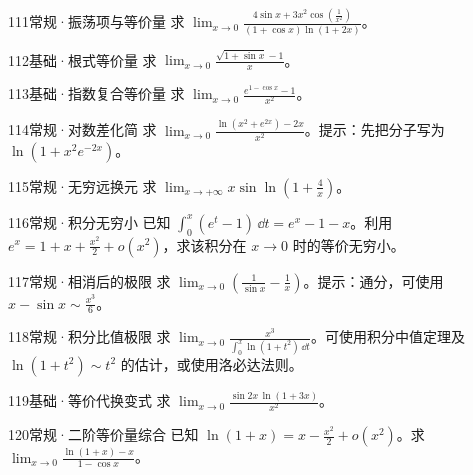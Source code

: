 \begin{exercise}{111}{常规·振荡项与等价量}
求 $\lim_{x\to0}\frac{4\sin x+3x^2\cos(\frac{1}{x^2})}{(1+\cos x)\ln(1+2x)}$。
\end{exercise}
\begin{exercise}{112}{基础·根式等价量}
求 $\lim_{x\to0}\frac{\sqrt{1+\sin x}-1}{x}$。
\end{exercise}
\begin{exercise}{113}{基础·指数复合等价量}
求 $\lim_{x\to0}\frac{e^{1-\cos x}-1}{x^2}$。
\end{exercise}
\begin{exercise}{114}{常规·对数差化简}
求 $\lim_{x\to0}\frac{\ln(x^2+e^{2x})-2x}{x^2}$。提示：先把分子写为 $\ln(1+x^2e^{-2x})$。
\end{exercise}
\begin{exercise}{115}{常规·无穷远换元}
求 $\lim_{x\to+\infty}x\sin\ln(1+\frac{4}{x})$。
\end{exercise}
\begin{exercise}{116}{常规·积分无穷小}
已知 $\int_0^x(e^t-1)\,\dd t=e^x-1-x$。利用 $e^x=1+x+\frac{x^2}{2}+o(x^2)$，求该积分在 $x\to0$ 时的等价无穷小。
\end{exercise}
\begin{exercise}{117}{常规·相消后的极限}
求 $\lim_{x\to0}(\frac{1}{\sin x}-\frac{1}{x})$。提示：通分，可使用 $x-\sin x\sim\frac{x^3}{6}$。
\end{exercise}
\begin{exercise}{118}{常规·积分比值极限}
求 $\lim_{x\to0}\frac{x^3}{\int_0^x\ln(1+t^2)\,\dd t}$。可使用积分中值定理及 $\ln(1+t^2)\sim t^2$ 的估计，或使用洛必达法则。
\end{exercise}
\begin{exercise}{119}{基础·等价代换变式}
求 $\lim_{x\to0}\frac{\sin2x\,\ln(1+3x)}{x^2}$。
\end{exercise}
\begin{exercise}{120}{常规·二阶等价量综合}
已知 $\ln(1+x)=x-\frac{x^2}{2}+o(x^2)$。求 $\lim_{x\to0}\frac{\ln(1+x)-x}{1-\cos x}$。
\end{exercise}
